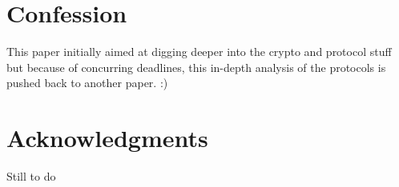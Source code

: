 \documentclass{vldb}
\begin{document}
\balance

\section{Confession}

This paper initially aimed at digging deeper into the crypto and protocol stuff but because of concurring deadlines, this in-depth analysis of the protocols is pushed back to another paper. :) 

\section{Acknowledgments}

Still to do 


\end{document}
